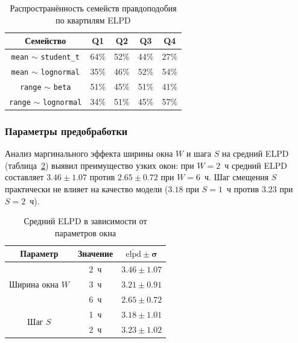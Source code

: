 \documentclass[14pt]{mmcs_article}
\begin{document}
	\begin{table}[H]
		\centering
		\caption{Распространённость семейств правдоподобия 
			по квартилям ELPD}
		\label{tab:lik_prevalence}
		\begin{tabular}{|c|c|c|c|c|}
			\hline
			\textbf{Семейство} & \textbf{Q1} & \textbf{Q2} & 
			\textbf{Q3} & \textbf{Q4} \\
			\hline
			\texttt{mean} $\sim$ \texttt{student\_t} & 64\% & 52\% & 44\% & 27\% \\
			\hline
			\texttt{mean} $\sim$ \texttt{lognormal} & 35\% & 46\% & 52\% & 54\% \\
			\hline
			\texttt{range} $\sim$ \texttt{beta} & 51\% & 45\% & 51\% & 41\% \\
			\hline
			\texttt{range} $\sim$ \texttt{lognormal} & 34\% & 51\% & 45\% & 57\% \\
			\hline
		\end{tabular}
	\end{table}
	
	\subsubsection*{Параметры предобработки}
	
	Анализ маргинального эффекта ширины окна $W$ и шага $S$ на
	средний ELPD (таблица~\ref{tab:window_effect}) выявил
	преимущество узких окон: при $W = 2$~ч средний ELPD составляет
	$3.46 \pm 1.07$ против $2.65 \pm 0.72$ при $W = 6$~ч. Шаг
	смещения $S$ практически не влияет на качество модели ($3.18$
	при $S = 1$~ч против $3.23$ при $S = 2$~ч).
	
	\begin{table}[H]
		\centering
		\caption{Средний ELPD в зависимости от параметров окна}
		\label{tab:window_effect}
		\begin{tabular}{|c|c|c|}
			\hline
			\textbf{Параметр} & \textbf{Значение} & 
			$\boldsymbol{\overline{\mathrm{elpd}} \pm \sigma}$ \\
			\hline
			\multirow{3}{*}{Ширина окна $W$} & 2~ч & $3.46 \pm 1.07$ \\
			& 3~ч & $3.21 \pm 0.91$ \\
			& 6~ч & $2.65 \pm 0.72$ \\
			\hline
			\multirow{2}{*}{Шаг $S$} & 1~ч & $3.18 \pm 1.01$ \\
			& 2~ч & $3.23 \pm 1.02$ \\
			\hline
		\end{tabular}
	\end{table}
	
\end{document}
